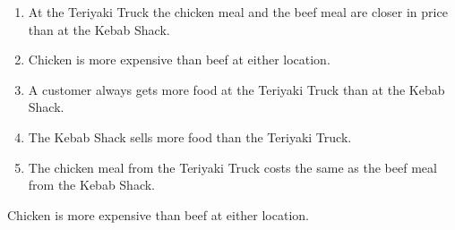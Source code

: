 \ifactodd
	\begin{enumerate}[label=\textbf{\Alph*.},itemsep=\fill,align=left]
		\item At the Teriyaki Truck the chicken meal and the beef meal are closer in price than at the Kebab Shack.
		\item Chicken is more expensive than beef at either location. %
		\item A customer always gets more food at the Teriyaki Truck than at the Kebab Shack.
		\item The Kebab Shack sells more food than the Teriyaki Truck.
		\item The chicken meal from the Teriyaki Truck costs the same as the beef meal from the Kebab Shack.
	\end{enumerate}
\else
\fi

\ifgridin
 Chicken is more expensive than beef at either location. %
		
\else
\fi

